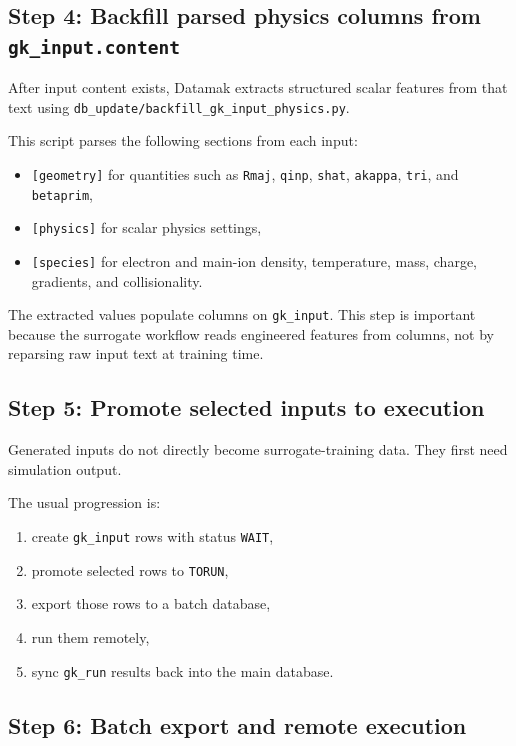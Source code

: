 \documentclass[11pt]{article}
\newcommand{\code}[1]{\texttt{#1}}
\begin{document}
\subsection{Step 4: Backfill parsed physics columns from \code{gk\_input.content}}

After input content exists, Datamak extracts structured scalar features from
that text using \code{db\_update/backfill\_gk\_input\_physics.py}.

This script parses the following sections from each input:

\begin{itemize}
\item \code{[geometry]} for quantities such as \code{Rmaj}, \code{qinp},
\code{shat}, \code{akappa}, \code{tri}, and \code{betaprim},
\item \code{[physics]} for scalar physics settings,
\item \code{[species]} for electron and main-ion density, temperature, mass,
charge, gradients, and collisionality.
\end{itemize}

The extracted values populate columns on \code{gk\_input}. This step is
important because the surrogate workflow reads engineered features from columns,
not by reparsing raw input text at training time.

\subsection{Step 5: Promote selected inputs to execution}

Generated inputs do not directly become surrogate-training data. They first
need simulation output.

The usual progression is:

\begin{enumerate}
\item create \code{gk\_input} rows with status \code{WAIT},
\item promote selected rows to \code{TORUN},
\item export those rows to a batch database,
\item run them remotely,
\item sync \code{gk\_run} results back into the main database.
\end{enumerate}

\subsection{Step 6: Batch export and remote execution}
\end{document}
